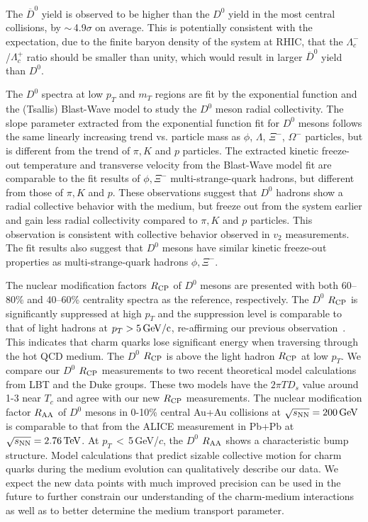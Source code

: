 \documentclass[%
 reprint,	
showpacs,
 amsmath,amssymb,
 aps,
 prc,
]{revtex4-1}
\providecommand{\DIFaddtex}[1]{{\protect\color{blue}\uwave{#1}}} %
\providecommand{\DIFdeltex}[1]{{\protect\color{red}\sout{#1}}}                      %
\providecommand{\DIFaddbegin}{} %
\providecommand{\DIFaddend}{} %
\providecommand{\DIFdelbegin}{} %
\providecommand{\DIFdelend}{} %
\providecommand{\DIFadd}[1]{\texorpdfstring{\DIFaddtex{#1}}{#1}} %
\providecommand{\DIFdel}[1]{\texorpdfstring{\DIFdeltex{#1}}{}} %
\begin{document}
The $\overline{D}^{0}$ yield is observed to be higher than the $D^0$ yield in the most central collisions, by \DIFdelbegin \DIFdel{$\sim$}\DIFdelend \DIFaddbegin \DIFadd{$\approx$}\DIFaddend \,4.9$\sigma$ on average. This is potentially consistent with the expectation, due to the finite baryon density of the system at RHIC, that the $\Lambda_{c}^-$/$\Lambda_{c}^+$ ratio should be smaller than unity, which would result in larger $\overline{D}^{0}$ yield than $D^0$.

The $D^0$ spectra at low $p_{T}$ and $m_{T}$ regions are fit by the exponential function and the (Tsallis) Blast-Wave model to study the $D^0$ meson radial collectivity. The slope parameter extracted from the exponential function fit for $D^0$ mesons follows the same linearly increasing trend vs. particle mass as $\phi$, $\Lambda$, $\Xi^-$, $\Omega^-$ particles, but is different from the trend of $\pi,K$ and $p$ particles. The extracted kinetic freeze-out temperature and transverse velocity from the Blast-Wave model fit are comparable to the fit results of $\phi,\Xi^-$ multi-strange-quark hadrons, but different from those of $\pi,K$ and $p$.\,\,These observations suggest that $D^0$ hadrons show a radial collective behavior with the medium, but freeze out from the system earlier and gain less radial collectivity compared to $\pi,K$ and $p$ particles. This observation is consistent with collective behavior observed in $v_2$ measurements. The fit results also suggest that $D^0$ mesons have similar kinetic freeze-out properties as multi-strange-quark hadrons $\phi,\Xi^-$.

The nuclear modification factors $R_{\rm CP}$ of $D^0$ mesons are presented with both 60--80\% and 40--60\% centrality spectra as the reference, respectively. The $D^0$ $R_{\rm CP}$ is significantly suppressed at high $p_{T}$ and the suppression level is comparable to that of light hadrons at $p_{T}> 5\,\rm{GeV}/c$, re-affirming our previous observation~\cite{Star_D_RAA}. This indicates that charm quarks lose significant energy when traversing through the hot QCD medium. The $D^0$ $R_{\rm CP}$ is above the light hadron $R_{\rm CP}$ at low $p_{T}$. We compare our $D^0$ $R_{\rm CP}$ measurements to two recent theoretical model calculations from LBT and the Duke groups. These two models have the $2\pi TD_s$ value around 1-3 near $T_{c}$ and agree with our new $R_{\rm CP}$ measurements. The nuclear modification factor $R_{\rm AA}$ of $D^0$ mesons in 0-10\% central Au+Au collisions at ${\sqrt{s_{\rm NN}} = \rm{200\,GeV}}$ is comparable to that from the ALICE measurement in Pb+Pb at ${\sqrt{s_{\rm NN}} = \rm{2.76\,TeV}}$. At $p_{T}$\,$<$\,5\,GeV/$c$, the $D^0$ $R_{\rm AA}$ shows a characteristic bump structure. Model calculations that predict sizable collective motion for charm quarks during the medium evolution can qualitatively describe our data. We expect the new data points with much improved precision can be used in the future to further constrain our understanding of the charm-medium interactions as well as to better determine the medium transport parameter.
\end{document}
